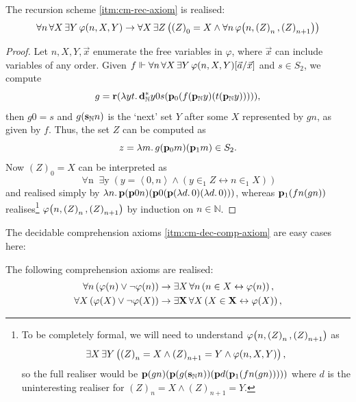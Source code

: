 \documentclass[12pt,openany]{book}
\theoremstyle{plain}
\theoremstyle{definition}
\newcommand\tuple[1]{\left\langle #1 \right\rangle}
\newcommand\opA[1]{\mathop{\forall #1}}
\newcommand\opE[1]{\mathop{\exists #1}}
\newcommand\oplam[1]{\mathop{\lambda #1.}}
\newcommand\bp{\mathbf{p}}
\newcommand\br{\mathbf{r}}
\newcommand\bsN{\mathbf{s}_\mathbb{N}}
\newcommand\bpN{\mathbf{p}_\mathbb{N}}
\newcommand\bdN{\mathbf{d}_\mathbb{N}}
\begin{document}
\begin{lemma}
  \label{lem:cm-rec-real}
  The recursion scheme \ref{itm:cm-rec-axiom} is realised:
  \[\opA{n} \opA{X} \opE{Y} \varphi\mleft(n, X, Y\mright) \rightarrow \opA{X} \opE{Z} \left(\left(Z\right)_0 = X \land \opA{n} \varphi\mleft(n, \left(Z\right)_n, \left(Z\right)_{n + 1}\mright)\right)\]
\end{lemma}

\begin{proof}
  Let $n, X, Y, \vec{x}$ enumerate the free variables in $\varphi$, where $\vec{x}$ can include variables of any order. Given $f \Vdash \opA{n} \opA{X} \opE{Y} \varphi\mleft(n, X, Y\mright)\mleft[\vec{a}/\vec{x}\mright]$ and $s \in S_2$, we compute
  \[g = \br \mleft(\oplam{yt} \bdN^* y0s \mleft(\bp_0 \mleft(f \mleft(\bpN y\mright) \mleft(t \mleft(\bpN y\mright)\mright)\mright)\mright)\mright),\]
  then $g0 = s$ and $g \mleft(\bsN n\mright)$ is the `next' set $Y$ after some $X$ represented by $gn$, as given by $f$. Thus, the set $Z$ can be computed as
  \[z = \oplam{m} g \mleft(\bp_0 m\mright) \mleft(\bp_1 m\mright) \in S_2.\]
  Now $\left(Z\right)_0 = X$ can be interpreted as
  \[\opA{n} \opE{y} \left(y = \tuple{0, n} \land \left(y \in_1 Z \leftrightarrow n \in_1 X\right)\right)\]
  and realised simply by $\oplam{n} \bp \mleft(\bp 0n\mright) \mleft(\bp 0 \mleft(\bp \mleft(\oplam{d} 0\mright) \mleft(\oplam{d} 0\mright)\mright)\mright)$, whereas $\bp_1 \mleft(fn \mleft(gn\mright)\mright)$ realises\footnote{To be completely formal, we will need to understand $\varphi\mleft(n, \left(Z\right)_n, \left(Z\right)_{n + 1}\mright)$ as
    \[\opE{X} \opE{Y} \left(\left(Z\right)_n = X \land \left(Z\right)_{n + 1} = Y \land \varphi\mleft(n, X, Y\mright)\right),\]
    so the full realiser would be $\bp \mleft(gn\mright) \mleft(\bp \mleft(g \mleft(\bsN n\mright)\mright) \mleft(\bp d \mleft(\bp_1 \mleft(fn \mleft(gn\mright)\mright)\mright)\mright)\mright)$ where $d$ is the uninteresting realiser for $\left(Z\right)_n = X \land \left(Z\right)_{n + 1} = Y$.} $\varphi\mleft(n, \left(Z\right)_n, \left(Z\right)_{n + 1}\mright)$ by induction on $n \in \mathbb{N}$.
\end{proof}

The decidable comprehension axioms \ref{itm:cm-dec-comp-axiom} are easy cases here:
\begin{lemma}
  The following comprehension axioms are realised:
  \begin{align*}
    \opA{n} \left(\varphi\mleft(n\mright) \lor \neg \varphi\mleft(n\mright)\right) & \rightarrow \opE{X} \opA{n} \left(n \in X \leftrightarrow \varphi\mleft(n\mright)\right),                   \\
    \opA{X} \left(\varphi\mleft(X\mright) \lor \neg \varphi\mleft(X\mright)\right) & \rightarrow \opE{\mathbf{X}} \opA{X} \left(X \in \mathbf{X} \leftrightarrow \varphi\mleft(X\mright)\right),
  \end{align*}
\end{lemma}
\end{document}
